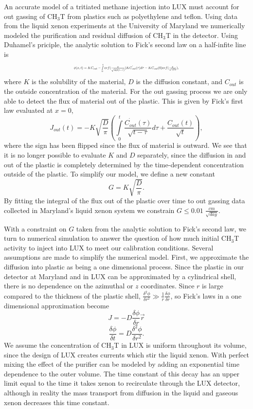 \newcommand*{\Scale}[2][4]{\scalebox{#1}{$#2$}}%

An accurate model of a tritiated methane injection into LUX must account for out gassing of CH$_3$T from plastics such as polyethylene and teflon.  Using data from the liquid xenon experiments at the University of Maryland we numerically modeled the purification and residual diffusion of CH$_3$T in the detector.  Using Duhamel's priciple, the analytic solution to Fick's second law on a half-infite line is
\[\Scale[0.5]{\phi (x,t) = KC_{out} - \int \limits_0^t erf(\frac{x}{\sqrt{4D(t - \tau)}})K\dot{C_{out}}(\tau)d\tau - KC_{out}(0)erf(\frac{x}{\sqrt{4Dt}}),}\]
where $K$ is the solubility of the material, $D$ is the diffusion constant, and $C_{out}$ is the outside concentration of the material. 
For the out gassing process we are only able to detect the flux of material out of the plastic.  This is given by Fick's first law evaluated at $x=0$,
\[J_{out}(t)= - K \sqrt{\frac{D}{\pi}}\left( \int \limits_0^t \frac{\dot{C_{out}}(\tau)}{\sqrt{t-\tau}} d \tau + \frac{C_{out}(t)}{\sqrt{t}}\right),\]
where the sign has been flipped since the flux of material is outward.  We see that it is no longer possible to evaluate $K$ and $D$ separately, since the diffusion in and out of the plastic is completely determined by the time-dependent concentration outside of the plastic.  To simplify our model, we define a new constant
\[ G = K \sqrt{ \frac{D}{ \pi }} .\]
By fitting the integral of the flux out of the plastic over time to out gassing data collected in Maryland's liquid xenon system we constrain $G \leq 0.01 \; \frac{cm}{\sqrt{day}}.$ 

With a constraint on $G$ taken from the analytic solution to Fick's second law, we turn to numerical simulation to answer the question of how much initial CH$_3$T activity to inject into LUX to meet our calibration conditions.  Several assumptions are made to simplify the numerical model.  First, we approximate the diffusion into plastic as being a one dimensional process.  Since the plastic in our detector at Maryland and in LUX can be approximated by a cylindrical shell, there is no dependence on the azimuthal or $z$ coordinates.  Since $r$ is large compared to the thickness of the plastic shell, $\frac{\delta^2 \phi}{\delta r^2} \gg \frac{1}{r} \frac {\delta \phi}{\delta r}$, so Fick's laws in a one dimensional approximation become
\[J=-D\frac{\delta \phi}{\delta r}\vec{r}\]
\[\frac{\delta \phi}{\delta t} = D \frac{\delta^2 \phi}{\delta r^2}.\]  We assume the concentration of CH$_3$T in LUX is uniform throughout its volume, since the design of LUX creates currents which stir the liquid xenon.  With perfect mixing the effect of the purifier can be modeled by adding an exponential time dependence to the outer volume.  The time constant of this decay has an upper limit equal to the time it takes xenon to recirculate through the LUX detector, although in reality the mass transport from diffusion in the liquid and gaseous xenon decreases this time constant. 

